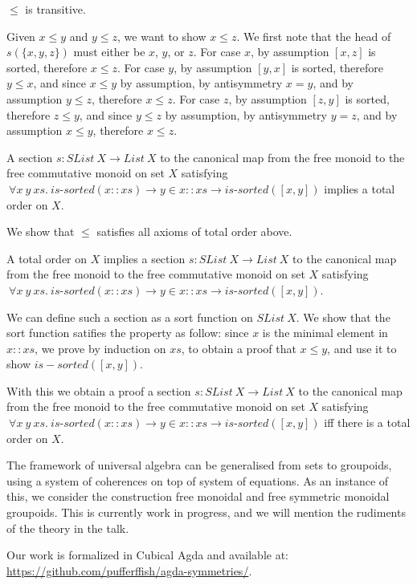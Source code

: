 \documentclass{article}
\begin{document}
\begin{mythm}
    $\leq$ is transitive.
\end{mythm}
Given $x \leq y$ and $y \leq z$, we want to show $x \leq z$. We first note that the head of $s(\{x,y,z\})$
must either be $x$, $y$, or $z$.
For case $x$, by assumption $[x, z]$ is sorted, therefore $x \leq z$.
For case $y$, by assumption $[y, x]$ is sorted, therefore $y \leq x$, and since $x \leq y$ by assumption,
by antisymmetry $x = y$, and by assumption $y \leq z$, therefore $x \leq z$.
For case $z$, by assumption $[z, y]$ is sorted, therefore $z \leq y$, and since $y \leq z$ by assumption,
by antisymmetry $y = z$, and by assumption $x \leq y$, therefore $x \leq z$.

\begin{mythm}
    A section $s : SList \: X \rightarrow List \: X$ to the canonical map from the free monoid to the free commutative monoid on set $X$
    satisfying
    $\: \forall x \: y \: xs. \: \textit{is-sorted}(x :: xs) \rightarrow y \in x :: xs \rightarrow \textit{is-sorted}([x, y])$
    implies a total order on $X$.
\end{mythm}
    We show that $\leq$ satisfies all axioms of total order above.

\begin{mythm}
    A total order on $X$ implies
    a section $s : SList \: X \rightarrow List \: X$ to the canonical map from the free monoid to the free commutative monoid on set $X$
    satisfying
    $\: \forall x \: y \: xs. \: \textit{is-sorted}(x :: xs) \rightarrow y \in x :: xs \rightarrow \textit{is-sorted}([x, y])$.
\end{mythm}
    We can define such a section as a sort function on $SList \: X$.
    We show that the sort function satifies the property
    as follow: since $x$ is the minimal element in $x :: xs$, we prove by induction on $xs$,
    to obtain a proof that $x \leq y$, and use it to show $is-sorted([x, y])$.

    With this we obtain a proof
    a section $s : SList \: X \rightarrow List \: X$ to the canonical map from the free monoid to the free commutative monoid on set $X$
    satisfying
    $\: \forall x \: y \: xs. \: \textit{is-sorted}(x :: xs) \rightarrow y \in x :: xs \rightarrow \textit{is-sorted}([x, y])$
    iff there is a total order on $X$.


The framework of universal algebra can be generalised from sets to groupoids, using a system of coherences on top of
system of equations. As an instance of this, we consider the construction free monoidal and free symmetric monoidal
groupoids. This is currently work in progress, and we will mention the rudiments of the theory in the talk.

Our work is formalized in Cubical Agda and available at: \url{https://github.com/pufferffish/agda-symmetries/}.

\printbibliography
\end{document}
